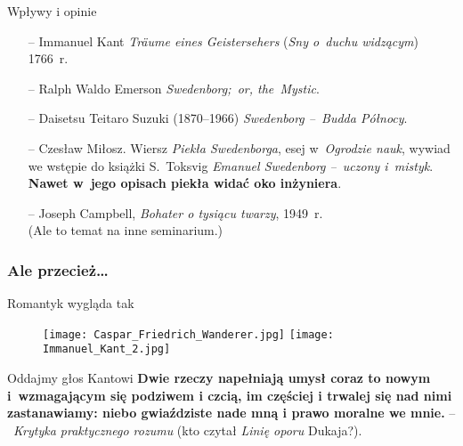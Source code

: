 \documentclass{beamer}  %
\begin{document}
\begin{frame}

  \begin{block}{Wpływy i opinie}
    \begin{itemize}
    \item[--] Immanuel Kant \emph{Tr\"{a}ume eines Geistersehers}
      (\emph{Sny o~duchu widzącym}) 1766~r.
    \item[--] Ralph Waldo Emerson \emph{Swedenborg;~or, the~Mystic}.
    \item[--] Daisetsu Teitaro Suzuki (1870--1966) \emph{Swedenborg
        --~Budda Północy}.
    \item[--] Czesław Miłosz. Wiersz \emph{Piekła Swedenborga}, esej
      w~\emph{Ogrodzie nauk}, wywiad we wstępie do książki S.~Toksvig
      \emph{Emanuel Swedenborg --~uczony i~mistyk}. \textbf{Nawet
        w~jego opisach piekła widać oko inżyniera}.
    \item[--] Joseph Campbell, \emph{Bohater o tysiącu twarzy},
      1949~r. \\ (Ale to temat na inne seminarium.)
    \end{itemize}
  \end{block}

\end{frame}



\begin{frame}
  \frametitle{Ale przecież\ldots}
  \begin{block}{Romantyk wygląda tak}
    \begin{figure}
      \centering

      \texttt{[image: Caspar\_Friedrich\_Wanderer.jpg]} \pause
      \texttt{[image: Immanuel\_Kant\_2.jpg]}
    \end{figure}
  \end{block}
  \pause

  \begin{block}{Oddajmy głos Kantowi}
    \textbf{Dwie rzeczy napełniają umysł coraz to nowym i~wzmagającym
      się podziwem i czcią, im częściej i trwalej się nad nimi
      zastanawiamy: niebo gwiaździste nade mną i prawo moralne we
      mnie.} --~\emph{Krytyka praktycznego rozumu} (kto czytał
    \emph{Linię oporu} Dukaja?).
  \end{block}

\end{frame}
\end{document}
